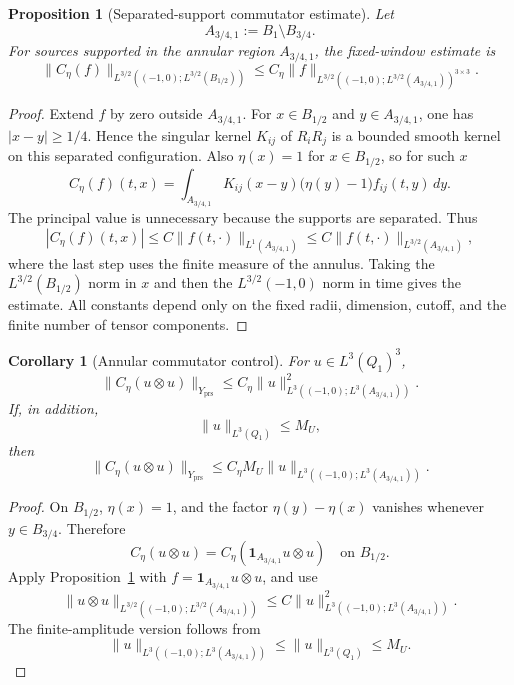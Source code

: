 \documentclass[11pt]{article}
\numberwithin{equation}{section}
\newtheorem{proposition}[proposition]{Proposition}
\newtheorem{corollary}[corollary]{Corollary}
\theoremstyle{definition}
\theoremstyle{remark}
\newcommand{\prs}{\mathrm{prs}}
\newcommand{\Yprs}{Y_{\prs}}
\newcommand{\Qone}{Q_1}
\begin{document}
\begin{proposition}[Separated-support commutator estimate]
\label{ps:prop:commutator-target}
Let
\[
    A_{3/4,1}:=B_1\setminus B_{3/4}.
\]
For sources supported in the annular region \(A_{3/4,1}\), the fixed-window
estimate is
\[
    \|C_\eta(f)\|_{L^{3/2}((-1,0);L^{3/2}(B_{1/2}))}
    \le
    C_\eta
    \|f\|_{L^{3/2}((-1,0);L^{3/2}(A_{3/4,1}))^{3\times3}}.
\]
\end{proposition}

\begin{proof}
Extend \(f\) by zero outside \(A_{3/4,1}\).  For \(x\in B_{1/2}\) and
\(y\in A_{3/4,1}\), one has \(|x-y|\ge 1/4\).  Hence the singular kernel
\(K_{ij}\) of \(R_iR_j\) is a bounded smooth kernel on this separated
configuration.  Also \(\eta(x)=1\) for \(x\in B_{1/2}\), so for such \(x\)
\[
    C_\eta(f)(t,x)
    =
    \int_{A_{3/4,1}}K_{ij}(x-y)\bigl(\eta(y)-1\bigr)f_{ij}(t,y)\,dy .
\]
The principal value is unnecessary because the supports are separated.  Thus
\[
    |C_\eta(f)(t,x)|
    \le
    C
    \|f(t,\cdot)\|_{L^1(A_{3/4,1})}
    \le
    C
    \|f(t,\cdot)\|_{L^{3/2}(A_{3/4,1})},
\]
where the last step uses the finite measure of the annulus.  Taking the
\(L^{3/2}(B_{1/2})\) norm in \(x\) and then the \(L^{3/2}(-1,0)\) norm in
time gives the estimate.  All constants depend only on the fixed radii,
dimension, cutoff, and the finite number of tensor components.
\end{proof}

\begin{corollary}[Annular commutator control]
\label{ps:cor:annular-commutator-control}
For \(u\in L^3(\Qone)^3\),
\[
    \|C_\eta(u\otimes u)\|_{\Yprs}
    \le
    C_\eta
    \|u\|_{L^3((-1,0);L^3(A_{3/4,1}))}^2.
\]
If, in addition,
\[
    \|u\|_{L^3(\Qone)}\le M_U,
\]
then
\[
    \|C_\eta(u\otimes u)\|_{\Yprs}
    \le
    C_\eta M_U
    \|u\|_{L^3((-1,0);L^3(A_{3/4,1}))}.
\]
\end{corollary}

\begin{proof}
On \(B_{1/2}\), \(\eta(x)=1\), and the factor
\(\eta(y)-\eta(x)\) vanishes whenever \(y\in B_{3/4}\).  Therefore
\[
    C_\eta(u\otimes u)
    =
    C_\eta(\mathbf 1_{A_{3/4,1}}u\otimes u)
    \quad\text{on }B_{1/2}.
\]
Apply Proposition~\ref{ps:prop:commutator-target} with
\(f=\mathbf 1_{A_{3/4,1}}u\otimes u\), and use
\[
    \|u\otimes u\|_{L^{3/2}((-1,0);L^{3/2}(A_{3/4,1}))}
    \le
    C\|u\|_{L^3((-1,0);L^3(A_{3/4,1}))}^2.
\]
The finite-amplitude version follows from
\[
    \|u\|_{L^3((-1,0);L^3(A_{3/4,1}))}
    \le
    \|u\|_{L^3(\Qone)}
    \le
    M_U.
\]
\end{proof}
\end{document}
